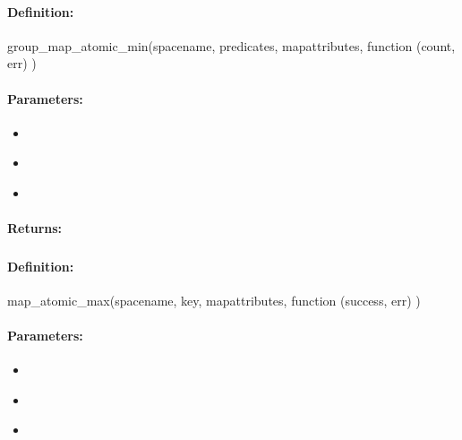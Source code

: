 \paragraph{Definition:}
\begin{javascriptcode}
group_map_atomic_min(spacename, predicates, mapattributes, function (count, err) {})
\end{javascriptcode}
\paragraph{Parameters:}
\begin{itemize}[noitemsep]
\item {}\\

\item {}\\

\item {}\\

\end{itemize}

\paragraph{Returns:}


\pagebreak
\subsubsection{}
\label{api:nodejs:map_atomic_max}


\paragraph{Definition:}
\begin{javascriptcode}
map_atomic_max(spacename, key, mapattributes, function (success, err) {})
\end{javascriptcode}
\paragraph{Parameters:}
\begin{itemize}[noitemsep]
\item {}\\

\item {}\\

\item {}\\

\end{itemize}


